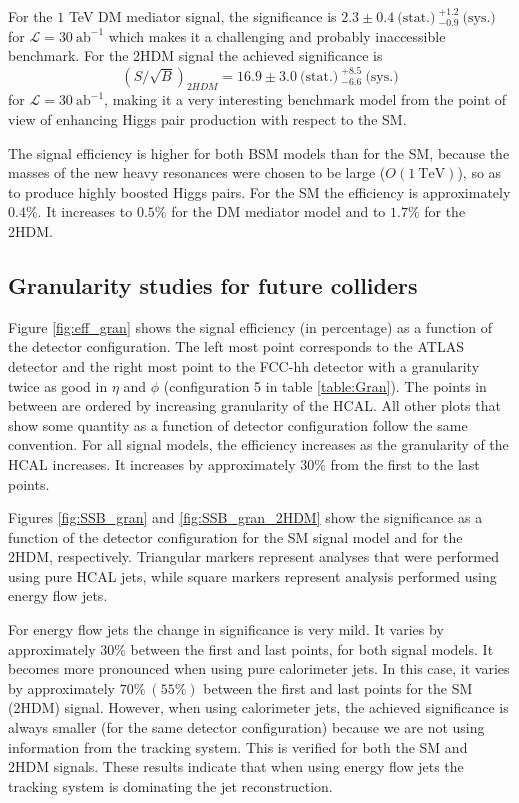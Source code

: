 For the $1$ TeV DM mediator signal, the significance is $2.3\pm0.4~\text{(stat.)}~^{+1.2}_{-0.9}~\text{(sys.)}$ for $\mathcal{L}=30~\text{ab}^{-1}$ which makes it a challenging and probably inaccessible benchmark. For the 2HDM signal the achieved significance is 
\begin{equation}
	(S/\sqrt{B})_{2HDM}=16.9\pm 3.0~\text{(stat.)}~^{+8.5}_{-6.6}~\text{(sys.)}
\end{equation}
for $\mathcal{L}=30~\text{ab}^{-1}$, making it a very interesting benchmark model from the point of view of enhancing Higgs pair production with respect to the SM. 

The signal efficiency is higher for both BSM models than for the SM, because the masses of the new heavy resonances were chosen to be large ($O(1 ~\text{TeV})$), so as to produce highly boosted Higgs pairs. For the SM the efficiency is approximately $0.4\%$. It increases to $0.5\%$ for the DM mediator model and to $1.7\%$ for the 2HDM. 

\subsection{Granularity studies for future colliders}
\label{sec:gran_studies}

Figure \ref{fig:eff_gran} shows the signal efficiency (in percentage) as a function of the detector configuration. The left most point corresponds to the ATLAS detector and the right most point to the FCC-hh detector with a granularity twice as good in $\eta$ and $\phi$ (configuration 5 in table \ref{table:Gran}). The points in between are ordered by increasing granularity of the HCAL. All other plots that show some quantity as a function of detector configuration follow the same convention. For all signal models, the efficiency increases as the granularity of the HCAL increases. It increases by approximately $30\%$ from the first to the last points.

Figures \ref{fig:SSB_gran} and \ref{fig:SSB_gran_2HDM} show the significance as a function of the detector configuration for the SM signal model and for the 2HDM, respectively. Triangular markers represent analyses that were performed using pure HCAL jets, while square markers represent analysis performed using energy flow jets. 

For energy flow jets the change in significance is very mild. It varies by approximately $30\%$ between the first and last points, for both signal models. It becomes more pronounced when using pure calorimeter jets. In this case, it varies by approximately $70\%~(55\%)$ between the first and last points for the SM (2HDM) signal. However, when using calorimeter jets, the achieved significance is always smaller (for the same detector configuration) because we are not using information from the tracking system. This is verified for both the SM and 2HDM signals. These results indicate that when using energy flow jets the tracking system is dominating the jet reconstruction.

